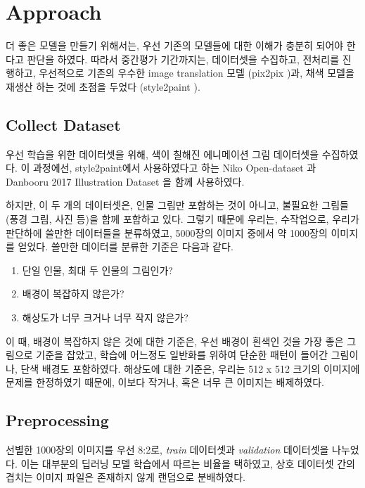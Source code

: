 \section{Approach}

더 좋은 모델을 만들기 위해서는, 우선 기존의 모델들에 대한 이해가 충분히 되어야 한다고 판단을 하였다.
따라서 중간평가 기간까지는, 데이터셋을 수집하고, 전처리를 진행하고, 우선적으로 기존의 우수한 image translation 모델 (pix2pix \cite{phillip2017})과, 채색 모델을 재생산 하는 것에 초점을 두었다 (style2paint \cite{Zhang2017}).

\subsection{Collect Dataset}

우선 학습을 위한 데이터셋을 위해, 색이 칠해진 에니메이션 그림 데이터셋을 수집하였다.
이 과정에선, style2paint에서 사용하였다고 하는 Niko Open-dataset \cite{ikuta2016}과 Danbooru 2017 Illustration Dataset \cite{danbooru2017}을 함께 사용하였다.

하지만, 이 두 개의 데이터셋은, 인물 그림만 포함하는 것이 아니고, 불필요한 그림들 (풍경 그림, 사진 등)을 함께 포함하고 있다.
그렇기 때문에 우리는, 수작업으로, 우리가 판단하에 쓸만한 데이터들을 분류하였고, 5000장의 이미지 중에서 약 1000장의 이미지를 얻었다.
쓸만한 데이터를 분류한 기준은 다음과 같다.
\begin{enumerate}[topsep=0pt,itemsep=-1ex,partopsep=1ex,parsep=1ex]
	\item 단일 인물, 최대 두 인물의 그림인가?
	\item 배경이 복잡하지 않은가?
	\item 해상도가 너무 크거나 너무 작지 않은가?
\end{enumerate}
이 때, 배경이 복잡하지 않은 것에 대한 기준은, 우선 배경이 흰색인 것을 가장 좋은 그림으로 기준을 잡았고, 학습에 어느정도 일반화를 위하여 단순한 패턴이 들어간 그림이나, 단색 배경도 포함하였다. 해상도에 대한 기준은, 우리는 512 x 512 크기의 이미지에 문제를 한정하였기 때문에, 이보다 작거나, 혹은 너무 큰 이미지는 배제하였다.

\subsection{Preprocessing}

선별한 1000장의 이미지를 우선 8:2로, \textit{train} 데이터셋과 \textit{validation} 데이터셋을 나누었다.
이는 대부분의 딥러닝 모델 학습에서 따르는 비율을 택하였고, 상호 데이터셋 간의 겹치는 이미지 파일은 존재하지 않게 랜덤으로 분배하였다.

